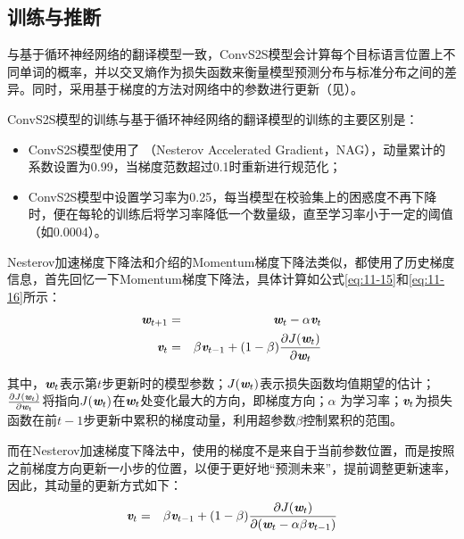 \subsection{训练与推断}

\parinterval 与基于循环神经网络的翻译模型一致，ConvS2S模型会计算每个目标语言位置上不同单词的概率，并以交叉熵作为损失函数来衡量模型预测分布与标准分布之间的差异。同时，采用基于梯度的方法对网络中的参数进行更新（见{\chapternine}）。

\parinterval ConvS2S模型的训练与基于循环神经网络的翻译模型的训练的主要区别是：
\begin{itemize}
\vspace{0.5em}
\item ConvS2S模型使用了{\small{}} （Nesterov Accelerated Gradient，NAG），动量累计的系数设置为0.99，当梯度范数超过0.1时重新进行规范化；

\vspace{0.5em}
\item ConvS2S模型中设置学习率为0.25，每当模型在校验集上的困惑度不再下降时，便在每轮的训练后将学习率降低一个数量级，直至学习率小于一定的阈值（如0.0004）。
\vspace{0.5em}

\end{itemize}

\parinterval Nesterov加速梯度下降法和{\chapternine}介绍的Momentum梯度下降法类似，都使用了历史梯度信息，首先回忆一下Momentum梯度下降法，具体计算如公式\eqref{eq:11-15}和\eqref{eq:11-16}所示：
\begin{eqnarray}
\textbf{\em w}_{t+1} & = &  \textbf{\em w}_t - \alpha \textbf{\em v}_t \label{eq:11-15} \\
\textbf{\em v}_t & = & \beta \textbf{\em v}_{t-1} + (1-\beta)\frac{\partial J(\textbf{\em w}_t)}{\partial \textbf{\em w}_t}  \label{eq:11-16}
\end{eqnarray}

\noindent 其中，$\textbf{\em w}_t$表示第$t$步更新时的模型参数；$J(\textbf{\em w}_t)$表示损失函数均值期望的估计；$\frac{\partial J(\textbf{\em w}_t)}{\partial \textbf{\em w}_t}$将指向$J(\textbf{\em w}_t)$在$\textbf{\em w}_t$处变化最大的方向，即梯度方向；$\alpha$ 为学习率；$\textbf{\em v}_t$为损失函数在前$t-1$步更新中累积的梯度动量，利用超参数$\beta$控制累积的范围。

\parinterval 而在Nesterov加速梯度下降法中，使用的梯度不是来自于当前参数位置，而是按照之前梯度方向更新一小步的位置，以便于更好地“预测未来”，提前调整更新速率，因此，其动量的更新方式如下：
\begin{eqnarray}
\textbf{\em v}_t & = & \beta \textbf{\em v}_{t-1} + (1-\beta)\frac{\partial J(\textbf{\em w}_t)}{\partial (\textbf{\em w}_{t} -\alpha \beta \textbf{\em v}_{t-1} )}
\label{eq:11-17}
\end{eqnarray}

